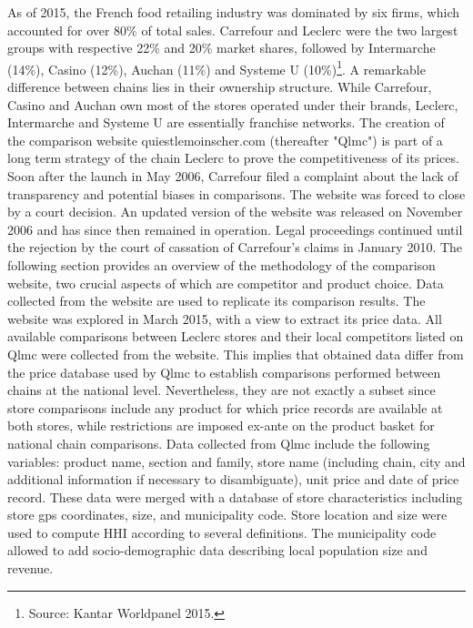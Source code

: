 \documentclass[english]{article}
\begin{document}
As of 2015, the French food retailing industry was dominated by six firms, which accounted for over 80\% of total sales. Carrefour and Leclerc were the two largest groups with respective 22\% and 20\% market shares, followed by Intermarche (14\%), Casino (12\%), Auchan (11\%) and Systeme U (10\%)\footnote{Source: Kantar Worldpanel 2015.}. A remarkable difference between chains lies in their ownership structure. While Carrefour, Casino and Auchan own most of the stores operated under their brands, Leclerc, Intermarche and Systeme U are essentially franchise networks. The creation of the comparison website quiestlemoinscher.com (thereafter "Qlmc") is part of a long term strategy of the chain Leclerc to prove the competitiveness of its prices. Soon after the launch in May 2006, Carrefour filed a complaint about the lack of transparency and potential biases in comparisons. The website was forced to close by a court decision. An updated version of the website was released on November 2006 and has since then remained in operation. Legal proceedings continued until the rejection by the court of cassation of Carrefour's claims in January 2010. The following section provides an overview of the methodology of the comparison website, two crucial aspects of which are competitor and product choice. Data collected from the website are used to replicate its comparison results. The website was explored in March 2015, with a view to extract its price data. All available comparisons between Leclerc stores and their local competitors listed on Qlmc were collected from the website. This implies that obtained data differ from the price database used by Qlmc to establish comparisons performed between chains at the national level. Nevertheless, they are not exactly a subset since store comparisons include any product for which price records are available at both stores, while restrictions are imposed ex-ante on the product basket for national chain comparisons. Data collected from Qlmc include the following variables: product name, section and family, store name (including chain, city and additional information if necessary to disambiguate), unit price and date of price record. These data were merged with a database of store characteristics including store gps coordinates, size, and municipality code. Store location and size were used to compute HHI according to several definitions. The municipality code allowed to add socio-demographic data describing local population size and revenue.

\end{document}
